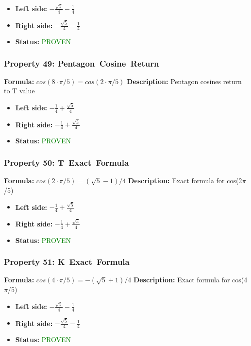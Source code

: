 \begin{itemize}
\item \textbf{Left side:} $- \frac{\sqrt{5}}{4} - \frac{1}{4}$
\item \textbf{Right side:} $- \frac{\sqrt{5}}{4} - \frac{1}{4}$
\item \textbf{Status:} \textcolor{green}{PROVEN}
\end{itemize}

\subsubsection*{Property 49: Pentagon~Cosine~Return}
\textbf{Formula:} $cos(8 \cdot \pi/5) = cos(2 \cdot \pi/5)$
\textbf{Description:} Pentagon cosines return to T value

\begin{itemize}
\item \textbf{Left side:} $- \frac{1}{4} + \frac{\sqrt{5}}{4}$
\item \textbf{Right side:} $- \frac{1}{4} + \frac{\sqrt{5}}{4}$
\item \textbf{Status:} \textcolor{green}{PROVEN}
\end{itemize}

\subsubsection*{Property 50: T~Exact~Formula}
\textbf{Formula:} $cos(2 \cdot \pi/5) = (\sqrt{5}-1)/4$
\textbf{Description:} Exact formula for cos(2$\pi$/5)

\begin{itemize}
\item \textbf{Left side:} $- \frac{1}{4} + \frac{\sqrt{5}}{4}$
\item \textbf{Right side:} $- \frac{1}{4} + \frac{\sqrt{5}}{4}$
\item \textbf{Status:} \textcolor{green}{PROVEN}
\end{itemize}

\subsubsection*{Property 51: K~Exact~Formula}
\textbf{Formula:} $cos(4 \cdot \pi/5) = -(\sqrt{5}+1)/4$
\textbf{Description:} Exact formula for cos(4$\pi$/5)

\begin{itemize}
\item \textbf{Left side:} $- \frac{\sqrt{5}}{4} - \frac{1}{4}$
\item \textbf{Right side:} $- \frac{\sqrt{5}}{4} - \frac{1}{4}$
\item \textbf{Status:} \textcolor{green}{PROVEN}
\end{itemize}


